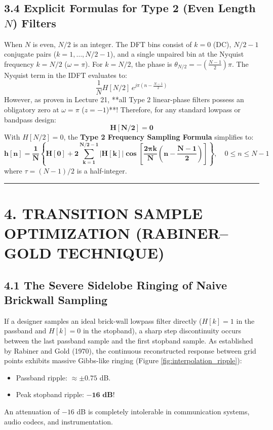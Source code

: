 \documentclass[11pt,a4paper]{article}
\begin{document}
\subsection{3.4 Explicit Formulas for Type 2 (Even Length \texorpdfstring{$N$}{N}) Filters}
When $N$ is even, $N/2$ is an integer. The DFT bins consist of $k=0$ (DC), $N/2 - 1$ conjugate pairs ($k = 1, \dots, N/2-1$), and a single unpaired bin at the Nyquist frequency $k = N/2$ ($\omega = \pi$).
For $k = N/2$, the phase is $\theta_{N/2} = -\left(\frac{N-1}{2}\right)\pi$. The Nyquist term in the IDFT evaluates to:
\begin{equation}
\frac{1}{N} H[N/2] \, e^{j \pi \left( n - \frac{N-1}{2} \right)}
\end{equation}
However, as proven in Lecture 21, **all Type 2 linear-phase filters possess an obligatory zero at $\omega = \pi$ ($z = -1$)**! Therefore, for any standard lowpass or bandpass design:
\begin{equation}
\mathbf{H[N/2] = 0}
\end{equation}
With $H[N/2] = 0$, the \textbf{Type 2 Frequency Sampling Formula} simplifies to:
\begin{equation}
\mathbf{h[n] = \frac{1}{N} \left\{ H[0] + 2 \sum_{k=1}^{N/2 - 1} |H[k]| \cos\left[ \frac{2\pi k}{N} \left( n - \frac{N-1}{2} \right) \right] \right\}}, \quad 0 \le n \le N-1
\label{eq:type2_formula}
\end{equation}
where $\tau = (N-1)/2$ is a half-integer.

\noindent\rule{\textwidth}{0.5pt}

\section{4. TRANSITION SAMPLE OPTIMIZATION (RABINER--GOLD TECHNIQUE)}

\subsection{4.1 The Severe Sidelobe Ringing of Naive Brickwall Sampling}
If a designer samples an ideal brick-wall lowpass filter directly ($H[k] = 1$ in the passband and $H[k] = 0$ in the stopband), a sharp step discontinuity occurs between the last passband sample and the first stopband sample.
As established by Rabiner and Gold (1970), the continuous reconstructed response between grid points exhibits massive Gibbs-like ringing (Figure \ref{fig:interpolation_ripple}):
\begin{itemize}
    \item Passband ripple: $\approx \pm 0.75$ dB.
    \item Peak stopband ripple: $\mathbf{-16 \text{ dB}}$!
\end{itemize}
An attenuation of $-16$ dB is completely intolerable in communication systems, audio codecs, and instrumentation.
\end{document}

